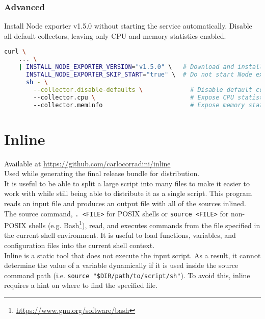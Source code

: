 \subsubsection{Advanced}
\label{subsubsec:corollary_projects_node_exporter_installer_example_advanced}

Install Node exporter v1.5.0 without starting the service automatically. Disable
all default collectors, leaving only CPU and memory statistics enabled.

\begin{lstlisting}[language=sh, morekeywords={curl, sh}, xleftmargin=\parindent, caption=Advanced installation with custom configuration parameters]
  curl \
    ... \
    | INSTALL_NODE_EXPORTER_VERSION="v1.5.0" \   # Download and install Node exporter v1.5.0
      INSTALL_NODE_EXPORTER_SKIP_START="true" \  # Do not start Node exporter service
      sh - \
        --collector.disable-defaults \             # Disable default collectors
        --collector.cpu \                          # Expose CPU statistics
        --collector.meminfo                        # Expose memory statistics
\end{lstlisting}

\section{Inline}
\label{sec:corollary_projects_inline}

Available at \url{https://github.com/carlocorradini/inline} \\ %
Used while generating the final release bundle for distribution. \\ %
It is useful to be able to split a large script into many files to make it easier
to work with while still being able to distribute it as a single script. This
program reads an input file and produces an output file with all of the sources
inlined. \\ %
The source command, \texttt{.\ <FILE>} for POSIX shells or \texttt{source <FILE>}
for non-POSIX shells (e.g. Bash\footnote{\url{https://www.gnu.org/software/bash}}),
read, and executes commands from the file specified in the current shell
environment. It is useful to load functions, variables, and configuration files into
the current shell context\cite{source}. \\ %
Inline is a static tool that does not execute the input script. As a result, it
cannot determine the value of a variable dynamically if it is used inside the
source command path (i.e. \texttt{source "\$DIR/path/to/script/sh"}). To avoid
this, inline requires a hint on where to find the specified file.

